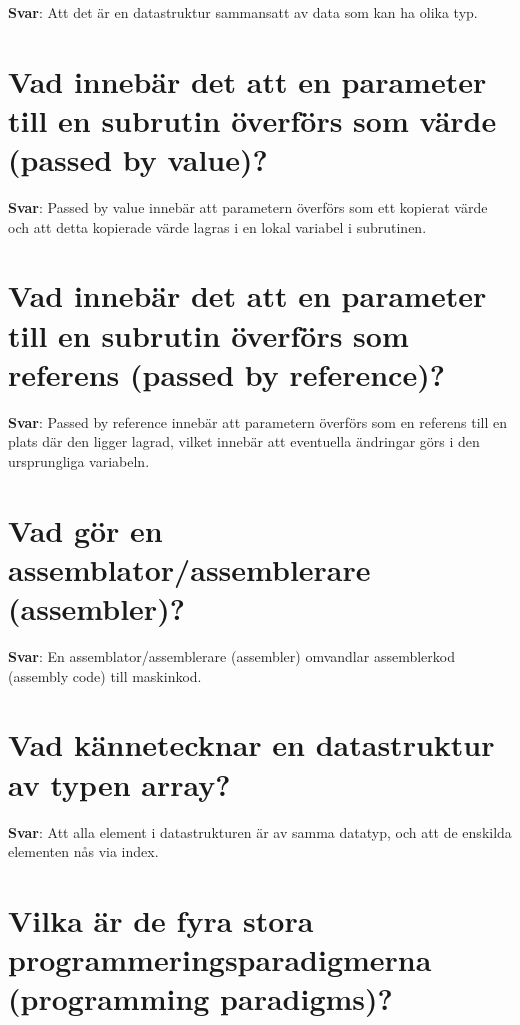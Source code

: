 \documentclass[a4paper,11pt,oneside]{book}
\begin{document}
\begin{sloppypar}
\label{q:194:sa:sv:True}

\textbf{Svar}: Att det \"ar en datastruktur sammansatt av data som kan ha olika typ.



\section{Vad inneb\"ar det att en parameter till en subrutin \"overf\"ors som v\"arde (passed by value)?}

\label{q:195:sa:sv:True}

\textbf{Svar}: Passed by value inneb\"ar att parametern \"overf\"ors som ett kopierat v\"arde och att detta kopierade v\"arde lagras i en lokal variabel i subrutinen.



\section{Vad inneb\"ar det att en parameter till en subrutin \"overf\"ors som referens (passed by reference)?}

\label{q:196:sa:sv:True}

\textbf{Svar}: Passed by reference inneb\"ar att parametern \"overf\"ors som en referens till en plats d\"ar den ligger lagrad, vilket inneb\"ar att eventuella \"andringar g\"ors i den ursprungliga variabeln.



\section{Vad g\"or en assemblator/assemblerare (assembler)?}

\label{q:197:sa:sv:True}

\textbf{Svar}: En assemblator/assemblerare (assembler) omvandlar assemblerkod (assembly code) till maskinkod.



\section{Vad k\"annetecknar en datastruktur av typen array?}

\label{q:198:sa:sv:True}

\textbf{Svar}: Att alla element i datastrukturen \"ar av samma datatyp, och att de enskilda elementen n\r{a}s via index.



\section{Vilka \"ar de fyra stora programmeringsparadigmerna (programming paradigms)?}


\end{sloppypar}
\end{document}
